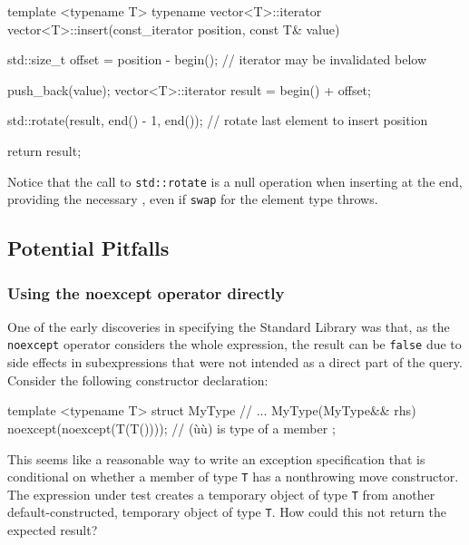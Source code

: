 \begin{emcppslisting}
template <typename T>
typename vector<T>::iterator vector<T>::insert(const_iterator position, const T& value)
{
    std::size_t offset = position - begin();
        // iterator may be invalidated below

    push_back(value);
    vector<T>::iterator result = begin() + offset;

    std::rotate(result, end() - 1, end());
        // rotate last element to insert position

    return result;
}
\end{emcppslisting}
    

\noindent Notice that the call to \lstinline!std::rotate! is a null operation when
inserting at the end, providing the necessary , even if \lstinline!swap! for the element type
throws.

\subsection[Potential Pitfalls]{Potential Pitfalls}\label{potential-pitfalls-noexceptoperator}

\subsubsection[Using the \lstinline!noexcept! operator directly]{Using the {\SubsubsecCode noexcept} operator directly}\label{using-the-noexcept-operator-directly}

One of the early discoveries in specifying the Standard Library was
that, as the \lstinline!noexcept! operator considers the whole expression,
the result can be \lstinline!false! due to side effects in subexpressions
that were not intended as a direct part of the query. Consider the
following constructor declaration:

\begin{emcppslisting}
template <typename T>
struct MyType
{
    // ...
    MyType(MyType&& rhs) noexcept(noexcept(T(T())));  // (ù{}ù) is type of a member
};
\end{emcppslisting}
    

\noindent This seems like a reasonable way to write an exception specification
that is conditional on whether a member of type \lstinline!T! has a
nonthrowing move constructor. The expression under test creates a
temporary object of type \lstinline!T! from another default-constructed,
temporary object of type \lstinline!T!. How could this not return the
expected result?

